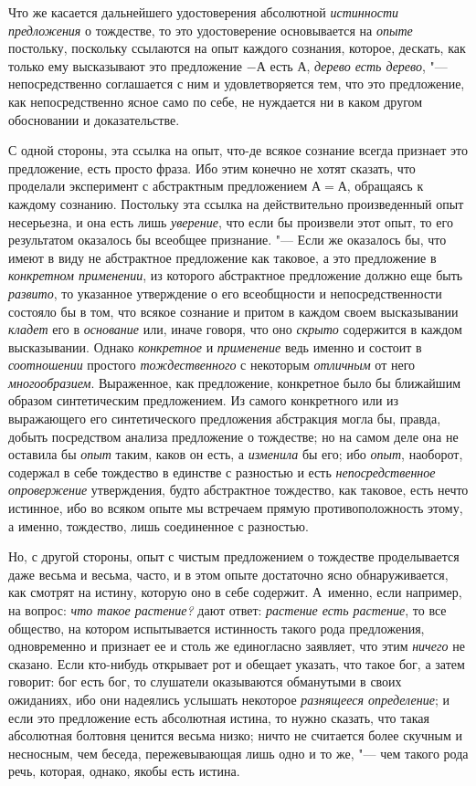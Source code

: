 Что же касается дальнейшего удостоверения абсолютной
{\em истинности предложения} о тождестве, то это
удостоверение основывается на {\em опыте} постольку,
поскольку ссылаются на опыт каждого сознания, которое, дескать, как только
ему высказывают это предложение $-А$ есть $А$,
{\em дерево есть дерево}, "--- непосредственно соглашается
с ним и удовлетворяется тем, что это предложение, как непосредственно ясное
само по себе, не нуждается ни в каком другом обосновании и доказательстве.

С одной стороны, эта ссылка на опыт, что-де всякое сознание всегда признает
это предложение, есть просто фраза. Ибо этим конечно не хотят сказать, что
проделали эксперимент с абстрактным предложением $А=А$,
обращаясь к каждому сознанию. Постольку эта ссылка на действительно
произведенный опыт несерьезна, и она есть лишь
{\em уверение}, что если бы произвели этот опыт, то его
результатом оказалось бы всеобщее признание. "--- Если же оказалось бы, что
имеют в виду не абстрактное предложение как таковое, а это предложение в
{\em конкретном применении}, из которого абстрактное
предложение должно еще быть {\em развито}, то указанное
утверждение о его всеобщности и непосредственности состояло бы в том, что
всякое сознание и притом в каждом своем высказывании
{\em кладет} его в {\em основание}
или, иначе говоря, что оно {\em скрыто} содержится в
каждом высказывании. Однако {\em конкретное} и
{\em применение} ведь именно и состоит в
{\em соотношении} простого
{\em тождественного} с некоторым
{\em отличным} от него
{\em многообразием}. Выраженное, как предложение,
конкретное было бы ближайшим образом синтетическим предложением. Из самого
конкретного или из выражающего его синтетического предложения абстракция
могла бы, правда, добыть посредством анализа предложение о тождестве; но на
самом деле она не оставила бы {\em опыт} таким, каков
он есть, а {\em изменила} бы его; ибо
{\em опыт}, наоборот, содержал в себе тождество в
единстве с разностью и есть {\em непосредственное
опровержение} утверждения, будто абстрактное тождество, как таковое, есть
нечто истинное, ибо во всяком опыте мы встречаем прямую противоположность
этому, а именно, тождество, лишь соединенное с разностью.

Но, с другой стороны, опыт с чистым предложением о тождестве проделывается
даже весьма и весьма, часто, и в этом опыте достаточно ясно обнаруживается,
как смотрят на истину, которую оно в себе содержит. А~именно, если
например, на вопрос: {\em что такое растение?} дают
ответ: {\em растение есть растение}, то все общество,
на котором испытывается истинность такого рода предложения, одновременно и
признает ее и столь же единогласно заявляет, что этим
{\em ничего} не сказано. Если кто-нибудь открывает рот
и обещает указать, что такое бог, а затем говорит: бог есть бог, то
слушатели оказываются обманутыми в своих ожиданиях, ибо они надеялись
услышать некоторое {\em разнящееся определение}; и если
это предложение есть абсолютная истина, то нужно сказать, что такая
абсолютная болтовня ценится весьма низко; ничто не считается более скучным
и несносным, чем беседа, пережевывающая лишь одно и то же, "--- чем такого
рода речь, которая, однако, якобы есть истина.


